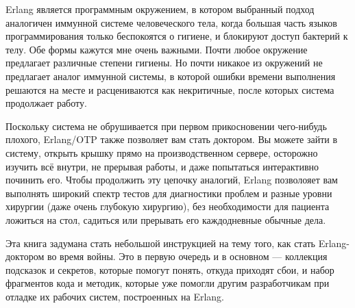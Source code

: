\documentclass[11pt, oneside]{book}   	%
\begin{document}
Erlang является программным окружением, в котором выбранный подход аналогичен иммун\-ной системе человеческого тела, когда большая часть языков программирования только беспоко\-ятся о гигиене, и блокируют доступ бактерий к телу. Обе формы кажутся мне очень важными. Почти любое окружение предлагает различные степени гигиены. Но почти никакое из окружений не предлагает аналог иммунной системы, в которой ошибки времени выполнения решаются на месте и расцениваются как некритичные, после которых система продолжает работу.

Поскольку система не обрушивается при первом прикосновении чего-нибудь плохого, Erlang/OTP также позволяет вам стать доктором. Вы можете зайти в систему, открыть крышку прямо на производственном сервере, осторожно изучить всё внутри, не прерывая работы, и даже попытаться интерактивно починить его. Чтобы продолжить эту цепочку аналогий, Erlang позволояет вам выполнять широкий спектр тестов для диагностики проблем и разные уровни хирургии (даже очень глубокую хирургию), без необходимости для пациента ложиться на стол, садиться или прерывать его каждодневные обычные дела.

Эта книга задумана стать небольшой инструкцией на тему того, как стать Erlang-доктором во время войны. Это в первую очередь и в основном --- коллекция подсказок и секретов, которые помогут понять, откуда приходят сбои, и набор фрагментов кода и методик, которые уже помогли другим разработчикам при отладке их рабочих систем, построенных на Erlang.
\end{document}
